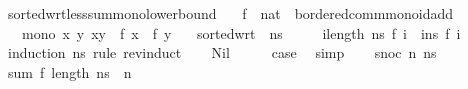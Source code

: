 \begin{isabellebody}
\begin{isamarkuptext}
\end{isamarkuptext}\isamarkuptrue%
\isamarkupfalse%
\ sorted{\isacharunderscore}{\kern0pt}wrt{\isacharunderscore}{\kern0pt}less{\isacharunderscore}{\kern0pt}sum{\isacharunderscore}{\kern0pt}mono{\isacharunderscore}{\kern0pt}lowerbound{\isacharcolon}{\kern0pt}\isanewline
\ \ \ f\ {\isacharcolon}{\kern0pt}{\isacharcolon}{\kern0pt}\ {\isachardoublequoteopen}nat\ {\isasymRightarrow}\ {\isacharparenleft}{\kern0pt}{\isacharprime}{\kern0pt}b{\isacharcolon}{\kern0pt}{\isacharcolon}{\kern0pt}ordered{\isacharunderscore}{\kern0pt}comm{\isacharunderscore}{\kern0pt}monoid{\isacharunderscore}{\kern0pt}add{\isacharparenright}{\kern0pt}{\isachardoublequoteclose}\isanewline
\ \ \ mono{\isacharcolon}{\kern0pt}\ {\isachardoublequoteopen}{\isasymAnd}x\ y{\isachardot}{\kern0pt}\ x{\isasymle}y\ {\isasymLongrightarrow}\ f\ x\ {\isasymle}\ f\ y{\isachardoublequoteclose}\isanewline
\ \ \ {\isachardoublequoteopen}sorted{\isacharunderscore}{\kern0pt}wrt\ {\isacharparenleft}{\kern0pt}{\isacharless}{\kern0pt}{\isacharparenright}{\kern0pt}\ ns\ {\isasymLongrightarrow}\isanewline
\ \ \ \ {\isacharparenleft}{\kern0pt}{\isasymSum}i{\isasymin}{\isacharbraceleft}{\kern0pt}{}{\isachardot}{\kern0pt}{\isachardot}{\kern0pt}{\isacharless}{\kern0pt}length\ ns{\isacharbraceright}{\kern0pt}{\isachardot}{\kern0pt}\ f\ i{\isacharparenright}{\kern0pt}\ {\isasymle}\ {\isacharparenleft}{\kern0pt}{\isasymSum}i{\isasymleftarrow}ns{\isachardot}{\kern0pt}\ f\ i{\isacharparenright}{\kern0pt}{\isachardoublequoteclose}\isanewline
%
\isadelimproof
%
\endisadelimproof
%
\isatagproof
{}\isamarkupfalse%
\ {\isacharparenleft}{\kern0pt}induction\ ns\ rule{\isacharcolon}{\kern0pt}\ rev{\isacharunderscore}{\kern0pt}induct{\isacharparenright}{\kern0pt}\isanewline
\ \ \isamarkupfalse%
\ Nil\isanewline
\ \ \isamarkupfalse%
\ \isamarkupfalse%
\ {\isacharquery}{\kern0pt}case\ \isamarkupfalse%
\ simp\isanewline
{}\isamarkupfalse%
\isanewline
\ \ \isamarkupfalse%
\ {\isacharparenleft}{\kern0pt}snoc\ n\ ns{\isacharparenright}{\kern0pt}\isanewline
\ \ \isamarkupfalse%
\ {\isachardoublequoteopen}sum\ f\ {\isacharbraceleft}{\kern0pt}{}{\isachardot}{\kern0pt}{\isachardot}{\kern0pt}{\isacharless}{\kern0pt}length\ {\isacharparenleft}{\kern0pt}ns\ {\isacharat}{\kern0pt}\ {\isacharbrackleft}{\kern0pt}n{\isacharbrackright}{\kern0pt}{\isacharparenright}{\kern0pt}{\isacharbraceright}{\kern0pt}\isanewline

\end{isabellebody}
